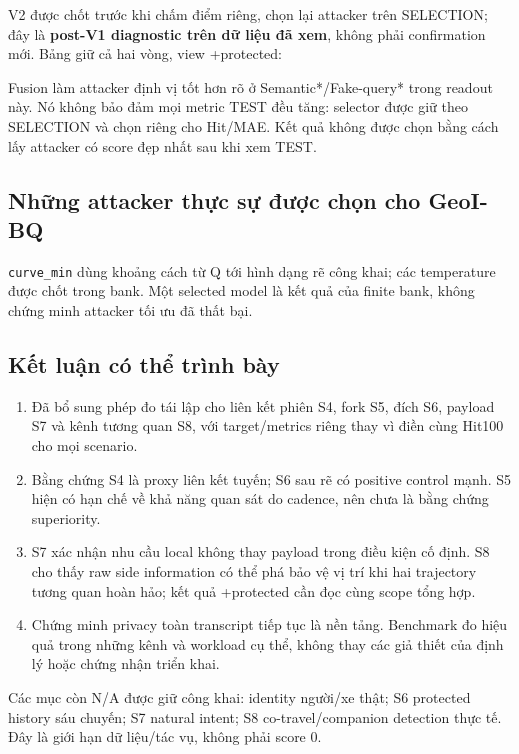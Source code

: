 \documentclass[10pt,a4paper]{article}
\begin{document}
V2 được chốt trước khi chấm điểm riêng, chọn lại attacker trên SELECTION; đây là \textbf{post-V1 diagnostic
trên dữ liệu đã xem}, không phải confirmation mới. Bảng giữ cả hai vòng, view +protected:
\begin{small}\end{small}

Fusion làm attacker định vị tốt hơn rõ ở Semantic*/Fake-query* trong readout này. Nó không bảo đảm
mọi metric TEST đều tăng: selector được giữ theo SELECTION và chọn riêng cho Hit/MAE.
Kết quả không được chọn bằng cách lấy attacker có score đẹp nhất sau khi xem TEST.

\subsection{Những attacker thực sự được chọn cho GeoI-BQ}
\begin{small}\end{small}
\texttt{curve\_min} dùng khoảng cách từ Q tới hình dạng rẽ công khai; các temperature được chốt trong bank.
Một selected model là kết quả của finite bank, không chứng minh attacker tối ưu đã thất bại.

\subsection{Kết luận có thể trình bày}
\begin{enumerate}
\item Đã bổ sung phép đo tái lập cho liên kết phiên S4, fork S5, đích S6, payload S7 và kênh tương quan S8,
với target/metrics riêng thay vì điền cùng Hit100 cho mọi scenario.
\item Bằng chứng S4 là proxy liên kết tuyến; S6 sau rẽ có positive control mạnh. S5 hiện có hạn chế về
khả năng quan sát do cadence, nên chưa là bằng chứng superiority.
\item S7 xác nhận nhu cầu local không thay payload trong điều kiện cố định. S8 cho thấy raw side information
có thể phá bảo vệ vị trí khi hai trajectory tương quan hoàn hảo; kết quả +protected cần đọc cùng scope tổng hợp.
\item Chứng minh privacy toàn transcript tiếp tục là nền tảng. Benchmark đo hiệu quả trong những kênh và
workload cụ thể, không thay các giả thiết của định lý hoặc chứng nhận triển khai.
\end{enumerate}
Các mục còn N/A được giữ công khai: identity người/xe thật; S6 protected history sáu chuyến;
S7 natural intent; S8 co-travel/companion detection thực tế. Đây là giới hạn dữ liệu/tác vụ, không phải score 0.
\end{document}
